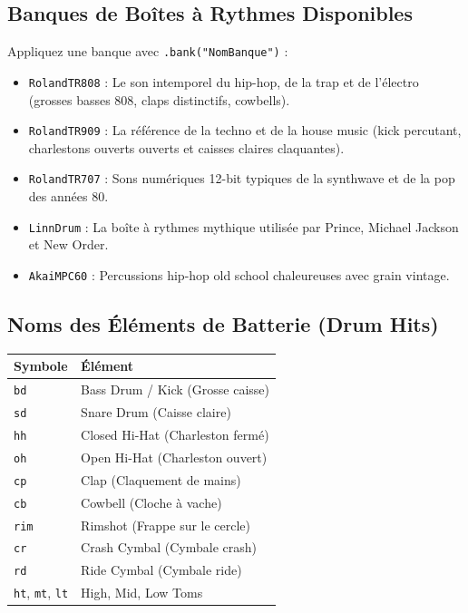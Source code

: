 \documentclass[a4paper,10pt]{article}
\begin{document}
\subsection{Banques de Boîtes à Rythmes Disponibles}
Appliquez une banque avec \texttt{.bank("NomBanque")} :
\begin{itemize}
    \item \texttt{RolandTR808} : Le son intemporel du hip-hop, de la trap et de l'électro (grosses basses 808, claps distinctifs, cowbells).
    \item \texttt{RolandTR909} : La référence de la techno et de la house music (kick percutant, charlestons ouverts ouverts et caisses claires claquantes).
    \item \texttt{RolandTR707} : Sons numériques 12-bit typiques de la synthwave et de la pop des années 80.
    \item \texttt{LinnDrum} : La boîte à rythmes mythique utilisée par Prince, Michael Jackson et New Order.
    \item \texttt{AkaiMPC60} : Percussions hip-hop old school chaleureuses avec grain vintage.
\end{itemize}

\subsection{Noms des Éléments de Batterie (Drum Hits)}
\begin{tabular}{|l|l|}
\hline
\textbf{Symbole} & \textbf{Élément} \\
\hline
\texttt{bd} & Bass Drum / Kick (Grosse caisse) \\
\texttt{sd} & Snare Drum (Caisse claire) \\
\texttt{hh} & Closed Hi-Hat (Charleston fermé) \\
\texttt{oh} & Open Hi-Hat (Charleston ouvert) \\
\texttt{cp} & Clap (Claquement de mains) \\
\texttt{cb} & Cowbell (Cloche à vache) \\
\texttt{rim} & Rimshot (Frappe sur le cercle) \\
\texttt{cr} & Crash Cymbal (Cymbale crash) \\
\texttt{rd} & Ride Cymbal (Cymbale ride) \\
\texttt{ht}, \texttt{mt}, \texttt{lt} & High, Mid, Low Toms \\
\hline
\end{tabular}
\end{document}
